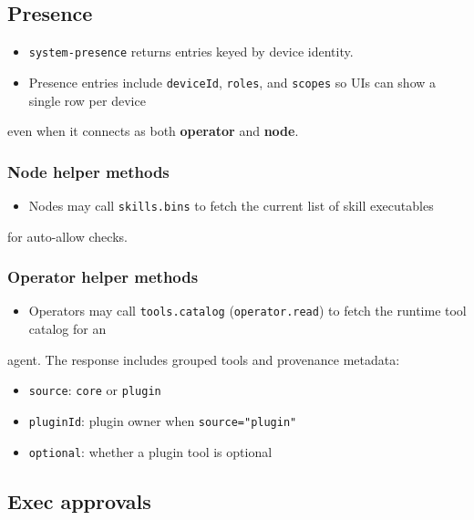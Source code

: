 \subsection{Presence}


\begin{itemize}
  \item \texttt{system-presence} returns entries keyed by device identity.
  \item Presence entries include \texttt{deviceId}, \texttt{roles}, and \texttt{scopes} so UIs can show a single row per device
\end{itemize}

even when it connects as both \textbf{operator} and \textbf{node}.

\subsubsection{Node helper methods}


\begin{itemize}
  \item Nodes may call \texttt{skills.bins} to fetch the current list of skill executables
\end{itemize}

for auto-allow checks.

\subsubsection{Operator helper methods}


\begin{itemize}
  \item Operators may call \texttt{tools.catalog} (\texttt{operator.read}) to fetch the runtime tool catalog for an
\end{itemize}

agent. The response includes grouped tools and provenance metadata:
\begin{itemize}
  \item \texttt{source}: \texttt{core} or \texttt{plugin}
  \item \texttt{pluginId}: plugin owner when \texttt{source="plugin"}
  \item \texttt{optional}: whether a plugin tool is optional
\end{itemize}


\subsection{Exec approvals}


